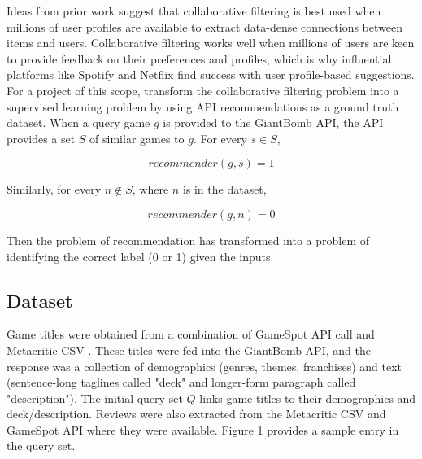 \documentclass[10pt,twocolumn]{article}
\begin{document}
Ideas from prior work suggest that collaborative filtering is best used when millions of user profiles are available to extract data-dense connections between items and users. Collaborative filtering works well when millions of users are keen to provide feedback on their preferences and profiles, which is why influential platforms like Spotify \cite{JacobsonSpotify}
and Netflix \cite{NetflixRS} find success with user profile-based suggestions. For a project of this scope, transform the collaborative filtering problem into a supervised learning problem by using API recommendations as a ground truth dataset. When a query game $g$ is provided to the GiantBomb API, the API provides a set $S$ of similar games to $g$. For every $s \in S$, 

\begin{equation}
    recommender(g, s) = 1
\end{equation}

Similarly, for every $n \not\in S$, where $n$ is in the dataset,

\begin{equation}
    recommender(g, n) = 0
\end{equation}

Then the problem of recommendation has transformed into a problem of identifying the correct label (0 or 1) given the inputs.

\subsection{Dataset}

Game titles were obtained from a combination of GameSpot API call \cite{GameSpot} and Metacritic CSV \cite{KaggleMetacritic}. These titles were fed into the GiantBomb API, and the response was a collection of demographics (genres, themes, franchises) and text (sentence-long taglines called "deck" and longer-form paragraph called "description"). The initial query set $Q$ links game titles to their demographics and deck/description. Reviews were also extracted from the Metacritic CSV and GameSpot API where they were available. Figure 1 provides a sample entry in the query set.

\end{document}
